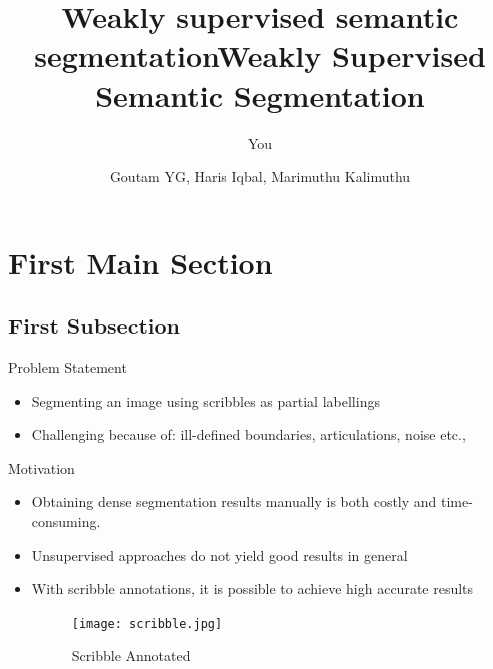 \documentclass{beamer}
\title{Weakly supervised semantic segmentation}
\author{You}
\begin{document}
	
	\title{Weakly Supervised Semantic Segmentation}
	
	
	\author{Goutam YG, Haris Iqbal, Marimuthu Kalimuthu}
	
	
	\subject{Theoretical Computer Science}
	
	\begin{frame}
		\titlepage
	\end{frame}
	
	\section{First Main Section}
	
	\subsection{First Subsection}
	
	\begin{frame}{Problem Statement}
		\begin{itemize}
			\item {
				Segmenting an image using scribbles as partial labellings
			}
			\item {
				Challenging because of: ill-defined boundaries, articulations, noise etc.,
			}
		\end{itemize}
	\end{frame}
	
	
	
	\begin{frame}{Motivation}
		\begin{itemize}
			\item {
				Obtaining dense segmentation results manually is both costly and time-consuming.
			}
			\item{
				Unsupervised approaches do not yield good results in general
			}
			
			\item{With scribble annotations, it is possible to achieve high accurate results  }
			
	\begin{figure}[H]
		\begin{center}
			\texttt{[image: scribble.jpg]}
			\caption{Scribble Annotated}
		\end{center}			
	\end{figure}

		\end{itemize}
	\end{frame}
	
\end{document}
